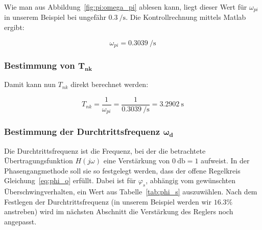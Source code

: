 Wie    man   aus    Abbildung~\ref{fig:pi:omega_pi}   ablesen    kann,   liegt
dieser   Wert  f\"ur   $\omega_{pi}$  in   unserem  Beispiel   bei  ungef\"ahr
$\SI{0.3}{\per\second}$. Die Kontrollrechnung mittels Matlab ergibt:

\begin{equation} \label{eq:pi:omega_pi}
    \omega_{pi} = \SI{0.3039}{\per\second}
\end{equation}


\subsubsection{Bestimmung von $\mathbf{T_{nk}}$}
Damit kann nun $T_{nk}$ direkt berechnet werden\footnotemark[5]:

\begin{equation} \label{eq:pi:omega_pi}
    T_{nk} = \frac{1}{\omega_{pi}} = \frac{1}{\SI{0.3039}{\per\second}} = \SI{3.2902}{\second}
\end{equation}



\subsubsection{Bestimmung der Durchtrittsfrequenz $\mathbf{\boldsymbol{\omega}_d}$}

Die   Durchtrittsfrequenz  ist   die   Frequenz,  bei   der  die   betrachtete
\"Ubertragungsfunktion $H(j\omega)$ eine Verst\"arkung von $\SI{0}{\decibel} =
1$  aufweist. In der  Phasengangmethode soll  sie so  festgelegt werden,  dass
der  offene  Regelkreis  Gleichung~\ref{eq:phi_o} erf\"ullt. Dabei  ist  f\"ur
$\varphi_s$, abh\"angig vom gew\"unschten \"Uberschwingverhalten, ein Wert aus
Tabelle~\ref{tab:phi_s} auszuw\"ahlen\footnotemark[6].  Nach dem Festlegen der
Durchtrittsfrequenz (in  unserem Beispiel werden wir  $16.3\%$ anstreben) wird
im n\"achsten Abschnitt die Verst\"arkung des Reglers noch angepasst.

